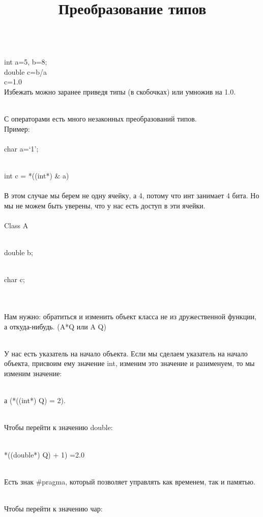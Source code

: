 \documentclass[a4paper,10pt]{article}
\title{Преобразование типов}
\begin{document}
\maketitle

\\int a=5, b=8;
\\double c=b/a
\\c=1.0
\\Избежать можно заранее приведя типы (в скобочках) или умножив на 1.0.

\\С операторами есть много незаконных преобразований типов. 
\\

Пример:
\\

\\char a=‘1’;

\\int c = *((int*) & a)
\\

\\В этом случае мы берем не одну ячейку, а 4, потому что инт занимает 4 бита. Но мы не можем быть уверены, что у нас есть доступ в эти ячейки. 
\\

\\Class A {

\\double b;

\\char c;}
\\

\\Нам нужно: обратиться и изменить объект класса не из дружественной функции, а откуда-нибудь. (A*Q или A Q)

\\У нас есть указатель на начало объекта. Если мы сделаем указатель на начало объекта, присвоим ему значение int, изменим это значение и разименуем, то мы изменим значение:

\\а (*((int*) Q) = 2).

\\Чтобы перейти к значению double:

\\*((double*) Q) + 1) =2.0

\\Есть знак #pragma, который позволяет управлять как временем, так и памятью.

\\Чтобы перейти к значению чар:
\end{document}
